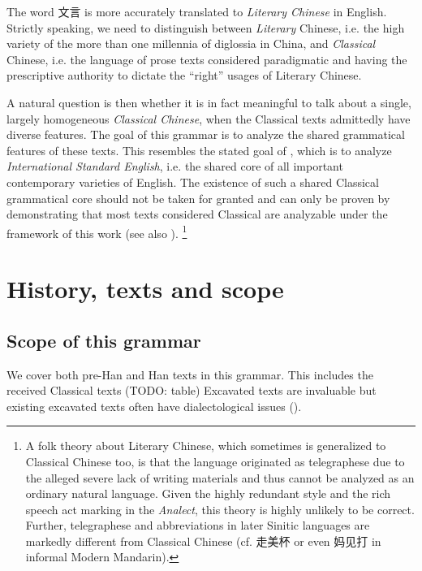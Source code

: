 \documentclass[UTF8, a4paper, oneside, scheme=plain, 12pt]{ctexrep}
\newcommand*{\term}[1]{\emph{#1}}
\newcommand{\work}[1]{\textit{#1}}
\begin{document}
The word 文言 is more accurately translated to \term{Literary Chinese} in English.
Strictly speaking, we need to distinguish between \term{Literary} Chinese,
i.e. the high variety of the more than one millennia of diglossia in China,
and \term{Classical} Chinese,
i.e. the language of prose texts considered paradigmatic and having the prescriptive authority to dictate the ``right'' usages of Literary Chinese.

A natural question is then whether it is in fact meaningful to talk about a single, largely homogeneous \term{Classical Chinese},
when the Classical texts admittedly have diverse features.
The goal of this grammar is to analyze the shared grammatical features of these texts.
This resembles the stated goal of \citet{cgel},
which is to analyze \term{International Standard English},
i.e. the shared core of all important contemporary varieties of English. 
The existence of such a shared Classical grammatical core should not be taken for granted
and can only be proven by demonstrating that most texts considered Classical are analyzable under the framework of this work (see also ).%
\footnote{
    A folk theory about Literary Chinese, which sometimes is generalized to Classical Chinese too, is that the language originated as telegraphese due to the alleged severe lack of writing materials and thus cannot be analyzed as an ordinary natural language.
    Given the highly redundant style and the rich speech act marking in the \work{Analect},
    this theory is highly unlikely to be correct.
    Further, telegraphese and abbreviations in later Sinitic languages are markedly different from Classical Chinese (cf. 走美杯 or even 妈见打 in informal Modern Mandarin).
}


\section{History, texts and scope}\label{sec:introduction.text}


\subsection{Scope of this grammar}

We cover both pre-Han and Han texts in this grammar.
This includes the received Classical texts (TODO: table) 
Excavated texts are invaluable but existing excavated texts often have dialectological issues 
().
\end{document}
